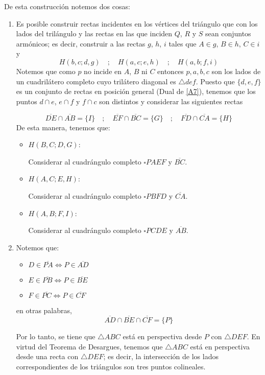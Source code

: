 \documentclass[12pt]{book}
\theoremstyle{definition}
\begin{document}
De esta construcción notemos dos cosas:
\begin{enumerate}
\item\label{polaridad1} Es posible construir rectas incidentes en los vértices del triángulo que con los lados del trilángulo y las rectas en las que inciden $Q$, $R$ y $S$ sean conjuntos armónicos; es decir, construir a las rectas $g$, $h$, $i$ tales que $A \in g$, $B \in h$, $C\in i$ y  
$$H(b,c;d,g) \quad ; \quad H(a,c;e,h) \quad ; \quad H(a,b;f,i)$$
Notemos que como $p$ no incide en $A$, $B$ ni $C$ entonces $p, a, b, c$ son los lados de un cuadrilátero completo cuyo trilátero diagonal es $\triangle def$. Puesto que $\{d,e,f\}$ es un conjunto de rectas en posición general (Dual de \ref{A7}), tenemos que los puntos $d \cap e$, $e \cap f$ y $f \cap c $ son distintos y considerar las siguientes rectas


$$\overline{DE} \cap \overline{AB} = \{I\} \quad ; \quad \overline{EF} \cap \overline{BC} = \{G\} \quad ; \quad \overline{FD} \cap \overline{CA} = \{H\}$$
De esta manera, tenemos que:
\begin{itemize}
\item $H(B,C;D,G)$:

Considerar al cuadrángulo completo $\square PAEF$ y $\overline{BC}$.

\item $H(A,C;E,H)$:

Considerar al cuadrángulo completo $\square PBFD$ y $\overline{CA}$.

\item $H(A,B;F,I)$:

Considerar al cuadrángulo completo $\square PCDE$ y $\overline{AB}$.
\end{itemize}

\item\label{polaridad2} Notemos que:
\begin{itemize}
\item $D \in \overline{PA} \Leftrightarrow P \in \overline{AD}$
\item $E \in \overline{PB} \Leftrightarrow P \in \overline{BE}$
\item $F \in \overline{PC} \Leftrightarrow P \in \overline{CF}$
\end{itemize}
en otras palabras,
$$\overline{AD} \cap \overline{BE} \cap \overline{CF} = \{P\}$$

Por lo tanto, se tiene que $\triangle ABC$ está en perspectiva desde $P$ con $\triangle DEF$. En virtud del Teorema de Desargues, tenemos que $\triangle ABC$ está en perspectiva desde una recta con $\triangle DEF$; es decir, la intersección de los lados correspondientes de los triángulos son tres puntos colineales.
\end{enumerate}
\end{document}
